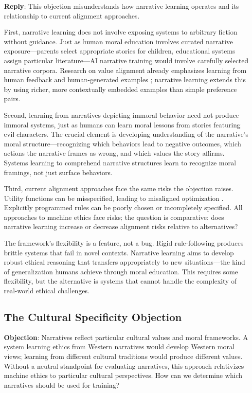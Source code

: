 \documentclass[12pt]{article}
\begin{document}
\textbf{Reply}: This objection misunderstands how narrative learning operates and its relationship to current alignment approaches.

First, narrative learning does not involve exposing systems to arbitrary fiction without guidance. Just as human moral education involves curated narrative exposure—parents select appropriate stories for children, educational systems assign particular literature—AI narrative training would involve carefully selected narrative corpora. Research on value alignment already emphasizes learning from human feedback and human-generated examples \citep{christiano2017deep}; narrative learning extends this by using richer, more contextually embedded examples than simple preference pairs.

Second, learning from narratives depicting immoral behavior need not produce immoral systems, just as humans can learn moral lessons from stories featuring evil characters. The crucial element is developing understanding of the narrative's moral structure—recognizing which behaviors lead to negative outcomes, which actions the narrative frames as wrong, and which values the story affirms. Systems learning to comprehend narrative structures learn to recognize moral framings, not just surface behaviors.

Third, current alignment approaches face the same risks the objection raises. Utility functions can be misspecified, leading to misaligned optimization \citep{amodei2016concrete}. Explicitly programmed rules can be poorly chosen or incompletely specified. All approaches to machine ethics face risks; the question is comparative: does narrative learning increase or decrease alignment risks relative to alternatives?

The framework's flexibility is a feature, not a bug. Rigid rule-following produces brittle systems that fail in novel contexts. Narrative learning aims to develop robust ethical reasoning that transfers appropriately to new situations—the kind of generalization humans achieve through moral education. This requires some flexibility, but the alternative is systems that cannot handle the complexity of real-world ethical challenges.

\subsection{The Cultural Specificity Objection}

\textbf{Objection}: Narratives reflect particular cultural values and moral frameworks. A system learning ethics from Western narratives would develop Western moral views; learning from different cultural traditions would produce different values. Without a neutral standpoint for evaluating narratives, this approach relativizes machine ethics to particular cultural perspectives. How can we determine which narratives should be used for training?
\end{document}
